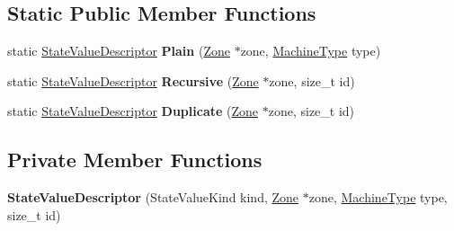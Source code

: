 \subsection*{Static Public Member Functions}
\begin{DoxyCompactItemize}
\item 
static \hyperlink{classv8_1_1internal_1_1compiler_1_1_state_value_descriptor}{State\+Value\+Descriptor} {\bfseries Plain} (\hyperlink{classv8_1_1internal_1_1_zone}{Zone} $\ast$zone, \hyperlink{classv8_1_1internal_1_1_machine_type}{Machine\+Type} type)\hypertarget{classv8_1_1internal_1_1compiler_1_1_state_value_descriptor_ae63b765dd89697d0d16868f0353ce874}{}\label{classv8_1_1internal_1_1compiler_1_1_state_value_descriptor_ae63b765dd89697d0d16868f0353ce874}

\item 
static \hyperlink{classv8_1_1internal_1_1compiler_1_1_state_value_descriptor}{State\+Value\+Descriptor} {\bfseries Recursive} (\hyperlink{classv8_1_1internal_1_1_zone}{Zone} $\ast$zone, size\+\_\+t id)\hypertarget{classv8_1_1internal_1_1compiler_1_1_state_value_descriptor_aabdaa1129d8bd28cc5dc37e31d4c4715}{}\label{classv8_1_1internal_1_1compiler_1_1_state_value_descriptor_aabdaa1129d8bd28cc5dc37e31d4c4715}

\item 
static \hyperlink{classv8_1_1internal_1_1compiler_1_1_state_value_descriptor}{State\+Value\+Descriptor} {\bfseries Duplicate} (\hyperlink{classv8_1_1internal_1_1_zone}{Zone} $\ast$zone, size\+\_\+t id)\hypertarget{classv8_1_1internal_1_1compiler_1_1_state_value_descriptor_a97fd6d9fb0a2f0b6a8f0416ab013181d}{}\label{classv8_1_1internal_1_1compiler_1_1_state_value_descriptor_a97fd6d9fb0a2f0b6a8f0416ab013181d}

\end{DoxyCompactItemize}
\subsection*{Private Member Functions}
\begin{DoxyCompactItemize}
\item 
{\bfseries State\+Value\+Descriptor} (State\+Value\+Kind kind, \hyperlink{classv8_1_1internal_1_1_zone}{Zone} $\ast$zone, \hyperlink{classv8_1_1internal_1_1_machine_type}{Machine\+Type} type, size\+\_\+t id)\hypertarget{classv8_1_1internal_1_1compiler_1_1_state_value_descriptor_a7d929bbd3833a21bcb20cf893aa5ef0d}{}\label{classv8_1_1internal_1_1compiler_1_1_state_value_descriptor_a7d929bbd3833a21bcb20cf893aa5ef0d}

\end{DoxyCompactItemize}
